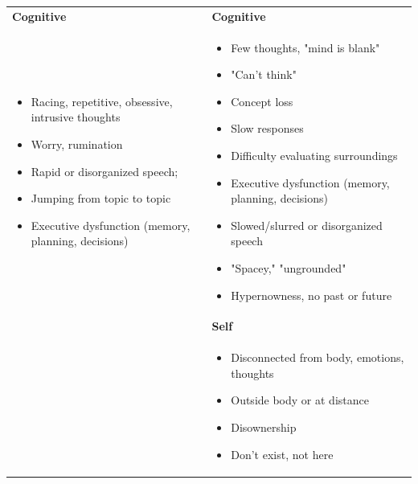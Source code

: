 \documentclass[12pt,letterpaper]{book}
\newenvironment{compactitemize}
{\begin{itemize}[nosep, leftmargin=1em, itemsep=0pt, topsep=0pt]}
{\end{itemize}}
\begin{document}
\begin{longtable}{p{}|p{}}
\textbf{Cognitive} & \textbf{Cognitive} \\*
\begin{compactitemize}
\item Racing, repetitive, obsessive, intrusive thoughts
\item Worry, rumination
\item Rapid or disorganized speech;
\item Jumping from topic to topic
\item Executive dysfunction (memory, planning, decisions)
\end{compactitemize}
&
\begin{compactitemize}
\item Few thoughts, "mind is blank"
\item "Can't think"
\item Concept loss
\item Slow responses
\item Difficulty evaluating surroundings
\item Executive dysfunction (memory, planning, decisions)
\item Slowed/slurred or disorganized speech
\item "Spacey," "ungrounded"
\item Hypernowness, no past or future
\end{compactitemize} \\[1ex]

& \textbf{Self} \\*
&
\begin{compactitemize}
\item Disconnected from body, emotions, thoughts
\item Outside body or at distance
\item Disownership
\item Don't exist, not here
\end{compactitemize} \\[1ex]


\end{longtable}
\end{document}
